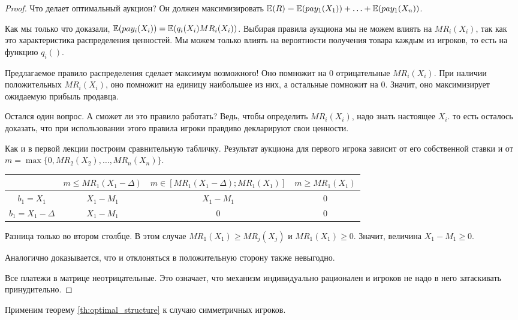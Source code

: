 \begin{proof}
Что делает оптимальный аукцион? Он должен максимизировать $ \operatorname{\mathbb{E}}(R)=\operatorname{\mathbb{E}}(pay_{1}(X_{1}))+\ldots+ \operatorname{\mathbb{E}}(pay_{1}(X_{n}))$.

Как мы только что доказали, $\operatorname{\mathbb{E}}(pay_{i}(X_{i}))=\operatorname{\mathbb{E}}(q_{i}(X_{i})MR_{i}(X_{i}))$. Выбирая правила аукциона мы не можем влиять на $ MR_{i}(X_{i}) $, так как это характеристика распределения ценностей. Мы можем только влиять на вероятности получения товара каждым из игроков, то есть на функцию $ q_{i}() $.

Предлагаемое правило распределения сделает максимум возможного! Оно помножит на 0 отрицательные $ MR_{i}(X_{i}) $. При наличии положительных $ MR_{i}(X_{i}) $, оно помножит на единицу наибольшее из них, а остальные помножит на 0. Значит, оно максимизирует ожидаемую прибыль продавца.

Остался один вопрос. А сможет ли это правило работать? Ведь, чтобы определить $ MR_{i}(X_{i}) $, надо знать настоящее $ X_{i} $. то есть осталось доказать, что при использовании этого правила игроки правдиво декларируют свои ценности.

Как и в первой лекции построим сравнительную табличку.  Результат аукциона для первого игрока зависит от его собственной ставки и от $ m=\max\{0,MR_{2}(X_{2}),\ldots,MR_{n}(X_{n})\} $.
\begin{tabular}{c|ccc}
& $ m\leq MR_{1}(X_{1}-\Delta) $ & $ m\in [MR_{1}(X_{1}-\Delta);MR_{1}(X_{1})] $ & $ m\geq MR_{1}(X_{1})$ \\
\hline
$ b_{1}=X_{1} $ & $ X_{1}-M_{1} $ & $ X_{1}-M_{1} $ &  0\\
$b_{1}=X_{1}-\Delta $ & $ X_{1}-M_{1} $ & 0 & 0 \\
\end{tabular}

Разница только во втором столбце. В этом случае $ MR_{1}(X_{1})\geq MR_{j}(X_{j}) $ и $ MR_{1}(X_{1})\geq 0 $. Значит, величина $ X_{1}-M_{1}\geq 0 $.

Аналогично доказывается, что и отклоняться в положительную сторону также невыгодно.

Все платежи в матрице неотрицательные. Это означает, что механизм индивидуально рационален и игроков не надо в него затаскивать принудительно.
\end{proof}

Применим теорему \ref{th:optimal_structure} к случаю симметричных игроков.

